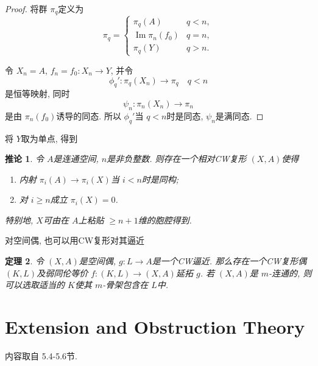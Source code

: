 \documentclass{ctexart}
\theoremstyle{plain}
\newtheorem{theorem}{定理}[section]
\newtheorem{corollary}[theorem]{推论}
\theoremstyle{definition}
\begin{document}
        \begin{proof}
            将群 $\pi_{q}$定义为 
            \begin{equation*}
              \pi_{q}=
              \begin{cases} \pi_{q}(A) & q<n,  \\ 
                \operatorname{Im}\pi_{n}(f_0) & q=n, \\
                \pi_{q}(Y) & q>n.
              \end{cases}
            \end{equation*}

            令 $X_{n}=A$, $f_{n}=f_0:X_{n}\to Y$, 并令 
            \begin{equation*}
              \phi_{q}':\pi_{q}(X_{n})\to \pi_{q}\quad q<n
            \end{equation*}
            是恒等映射, 同时 
            \begin{equation*}
              \psi_{n}:\pi_{n}(X_{n})\to \pi_{n}
            \end{equation*}
            是由 $\pi_{n}(f_0)$诱导的同态. 所以 $\phi_{q}'$当 $q<n$时是同态, $\psi_{n}$是满同态.
        \end{proof}

        将 $Y$取为单点, 得到

        \begin{corollary}
            \label{thm:eliminate higher homotopy by attaching cells}
            令 $A$是连通空间, $n$是非负整数. 则存在一个相对CW复形 $(X,A)$使得 
            \begin{enumerate}
                \item 内射 $\pi_{i}(A)\to \pi_{i}(X)$当 $i<n$时是同构;
                \item 对 $i\ge n$成立 $\pi_{i}(X)=0$.
            \end{enumerate}
            特别地, $X$可由在 $A$上粘贴 $\ge n+1$维的胞腔得到.
        \end{corollary}

        对空间偶, 也可以用CW复形对其逼近 

        \begin{theorem}
            令 $(X,A)$是空间偶, $g:L\to A$是一个CW逼近. 那么存在一个CW复形偶 $(K,L)$及弱同伦等价 $f:(K,L)\to (X,A)$延拓 $g$. 若 $(X,A)$是 $m$-连通的, 则可以选取适当的 $K$使其 $m$-骨架包含在 $L$中.
        \end{theorem}

    \section{Extension and Obstruction Theory}
        内容取自\cite{Whitehead1978} 5.4-5.6节.
\end{document}
